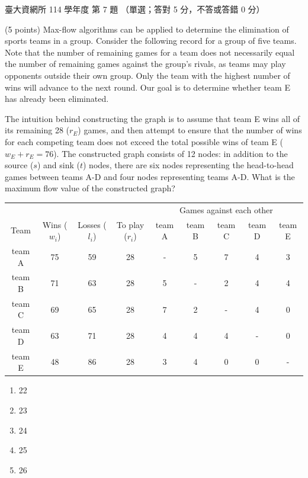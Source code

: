 \begin{pastexam}[label={px:ntu-114-dsa-07}]{臺大資網所 114 學年度 第 7 題}
（單選；答對 5 分，不答或答錯 0 分）

(5 points) Max-flow algorithms can be applied to determine the elimination of sports teams in a group. Consider
the following record for a group of five teams. Note that the number of remaining games for a team does not
necessarily equal the number of remaining games against the group's rivals, as teams may play opponents outside
their own group. Only the team with the highest number of wins will advance to the next round. Our goal is to
determine whether team E has already been eliminated.

The intuition behind constructing the graph is to assume that team E wins all of its remaining 28 ($r_E$) games,
and then attempt to ensure that the number of wins for each competing team does not exceed the total possible
wins of team E ($w_E+r_E=76$). The constructed graph consists of 12 nodes: in addition to the source ($s$) and
sink ($t$) nodes, there are six nodes representing the head-to-head games between teams A-D and four nodes
representing teams A-D. What is the maximum flow value of the constructed graph?
\begin{center}
\small
\begin{tabular}{c|ccc|ccccc}
\hline
 & & & & \multicolumn{5}{c}{Games against each other} \\
Team & Wins ($w_i$) & Losses ($l_i$) & To play ($r_i$) & team A & team B & team C & team D & team E \\ \hline
team A & 75 & 59 & 28 & - & 5 & 7 & 4 & 3 \\
team B & 71 & 63 & 28 & 5 & - & 2 & 4 & 4 \\
team C & 69 & 65 & 28 & 7 & 2 & - & 4 & 0 \\
team D & 63 & 71 & 28 & 4 & 4 & 4 & - & 0 \\
team E & 48 & 86 & 28 & 3 & 4 & 0 & 0 & - \\ \hline
\end{tabular}
\end{center}
\begin{enumerate}[label=(\Alph*)]
\item 22
\item 23
\item 24
\item 25
\item 26
\end{enumerate}
\end{pastexam}

